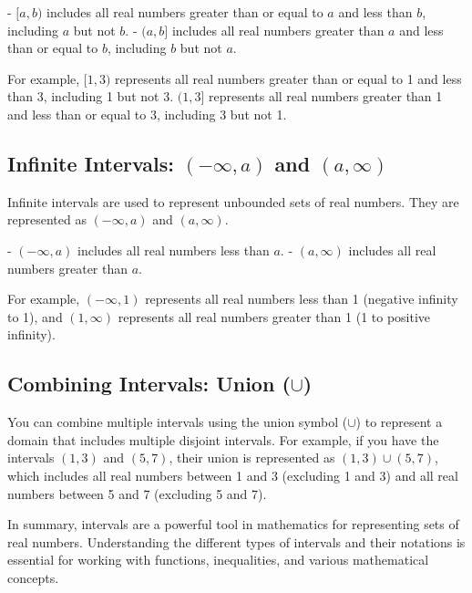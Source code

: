 - $[a, b)$ includes all real numbers greater than or equal to $a$ and less than $b$, including $a$ but not $b$.
- $(a, b]$ includes all real numbers greater than $a$ and less than or equal to $b$, including $b$ but not $a$.

For example, $[1, 3)$ represents all real numbers greater than or equal to 1 and less than 3, including 1 but not 3. $(1, 3]$ represents all real numbers greater than 1 and less than or equal to 3, including 3 but not 1.

\subsection{Infinite Intervals: $(-\infty, a)$ and $(a, \infty)$}

Infinite intervals are used to represent unbounded sets of real numbers. They are represented as $(-\infty, a)$ and $(a, \infty)$.

- $(-\infty, a)$ includes all real numbers less than $a$.
- $(a, \infty)$ includes all real numbers greater than $a$.

For example, $(-\infty, 1)$ represents all real numbers less than 1 (negative infinity to 1), and $(1, \infty)$ represents all real numbers greater than 1 (1 to positive infinity).

\subsection{Combining Intervals: Union ($\cup$)}

You can combine multiple intervals using the union symbol ($\cup$) to represent a domain that includes multiple disjoint intervals. For example, if you have the intervals $(1, 3)$ and $(5, 7)$, their union is represented as $(1, 3) \cup (5, 7)$, which includes all real numbers between 1 and 3 (excluding 1 and 3) and all real numbers between 5 and 7 (excluding 5 and 7).

In summary, intervals are a powerful tool in mathematics for representing sets of real numbers. Understanding the different types of intervals and their notations is essential for working with functions, inequalities, and various mathematical concepts.

